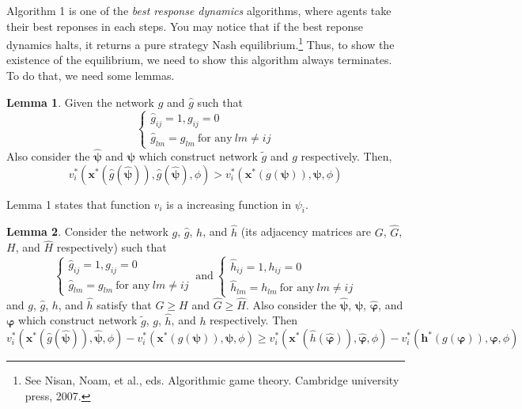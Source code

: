 \documentclass[12pt]{article}
\theoremstyle{definition}
\newtheorem{lemma}{Lemma}
\begin{document}
Algorithm 1 is one of the {\it{best response dynamics}} algorithms, where agents take their best reponses in each steps.
You may notice that if the best reponse dynamics halts, it returns a pure strategy Nash equilibrium.\footnote{See Nisan, Noam, et al., eds. Algorithmic game theory. Cambridge university press, 2007.}
Thus, to show the existence of the equilibrium, we need to show this algorithm always terminates.
To do that, we need some lemmas.

\begin{lemma}
	Given the network $g$ and $\hat{g}$ such that
	\[  \begin{cases}
			\hat{g}_{ij} = 1, g_{ij} = 0 \\
			\hat{g}_{lm} = g_{lm} \ \text{for any} \ lm  \neq ij
		\end{cases} \]
	Also consider the $\bm{\hat{\psi}}$ and $\bm{\psi}$  which construct network $\tilde{g}$ and $g$ respectively. 
	Then,
	\[ v_i^* (\bm{x}^*(\hat{g}(\bm{\hat{\psi}})), \hat{g}(\bm{\hat{\psi}}), \phi) > v_i^* (\bm{x}^*(g(\bm{\psi})), \bm{\psi}, \phi)\]
\end{lemma}

Lemma 1 states that function $v_i$ is a increasing function in $\psi_i$.

\begin{lemma}
	Consider the network $g$, $\hat{g}$, $h$, and $\hat{h}$ (its adjacency matrices are $G$, $\hat{G}$, $H$, and $\hat{H}$ respectively) such that
	\[  \begin{cases}
			\hat{g}_{ij} = 1, g_{ij} = 0 \\
			\hat{g}_{lm} = g_{lm} \ \text{for any} \ lm  \neq ij
		\end{cases}
		\ \text{and} \ 
		\begin{cases}
			\hat{h}_{ij} = 1, h_{ij} = 0 \\
			\hat{h}_{lm} = h_{lm} \ \text{for any} \ lm  \neq ij
		\end{cases} \]
	and $g$, $\hat{g}$, $h$, and $\hat{h}$ satisfy that $G \ge H$ and  $\hat{G} \ge \hat{H}$.
	Also consider the $\bm{\hat{\psi}}$, $\bm{\psi}$, $\bm{\hat{\varphi}}$, and $\bm{\varphi}$  which construct network $\tilde{g}$, $g$, $\hat{h}$, and $h$ respectively. 
	Then
	\[ v_i^*(\bm{x}^*(\hat{g}(\bm{\hat{\psi}})), \bm{\hat{\psi}}, \phi) - v_i^*(\bm{x}^*(g(\bm{\psi})), \bm{\psi}, \phi) \ge v_i^*(\bm{x}^*(\hat{h}(\bm{\hat{\varphi}})), \bm{\hat{\varphi}}, \phi) - v_i^*(\bm{h}^*(g(\bm{\varphi})), \bm{\varphi}, \phi)\]
\end{lemma}
\end{document}
